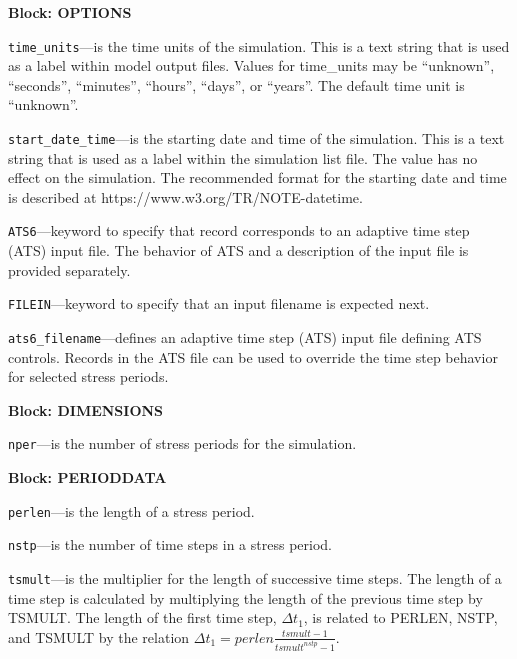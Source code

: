 
\item \textbf{Block: OPTIONS}

\begin{description}
\item \texttt{time\_units}---is the time units of the simulation.  This is a text string that is used as a label within model output files.  Values for time\_units may be ``unknown'',  ``seconds'', ``minutes'', ``hours'', ``days'', or ``years''.  The default time unit is ``unknown''.

\item \texttt{start\_date\_time}---is the starting date and time of the simulation.  This is a text string that is used as a label within the simulation list file.  The value has no effect on the simulation.  The recommended format for the starting date and time is described at https://www.w3.org/TR/NOTE-datetime.

\item \texttt{ATS6}---keyword to specify that record corresponds to an adaptive time step (ATS) input file.  The behavior of ATS and a description of the input file is provided separately.

\item \texttt{FILEIN}---keyword to specify that an input filename is expected next.

\item \texttt{ats6\_filename}---defines an adaptive time step (ATS) input file defining ATS controls.  Records in the ATS file can be used to override the time step behavior for selected stress periods.

\end{description}
\item \textbf{Block: DIMENSIONS}

\begin{description}
\item \texttt{nper}---is the number of stress periods for the simulation.

\end{description}
\item \textbf{Block: PERIODDATA}

\begin{description}
\item \texttt{perlen}---is the length of a stress period.

\item \texttt{nstp}---is the number of time steps in a stress period.

\item \texttt{tsmult}---is the multiplier for the length of successive time steps. The length of a time step is calculated by multiplying the length of the previous time step by TSMULT. The length of the first time step, $\Delta t_1$, is related to PERLEN, NSTP, and TSMULT by the relation $\Delta t_1= perlen \frac{tsmult - 1}{tsmult^{nstp}-1}$.

\end{description}

